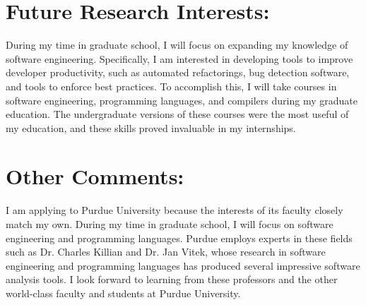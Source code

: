 \documentclass[11pt]{article}
\begin{document}
\section{Future Research Interests:}
During my time in graduate school, I will focus on expanding my knowledge of software engineering. Specifically, I am interested in developing tools to improve developer productivity, such as automated refactorings, bug detection software, and tools to enforce best practices. To accomplish this, I will take courses in software engineering, programming languages, and compilers during my graduate education. The undergraduate versions of these courses were the most useful of my education, and these skills proved invaluable in my internships.

\section{Other Comments:}
I am applying to Purdue University because the interests of its faculty closely match my own. During my time in graduate school, I will focus on software engineering and programming languages. Purdue employs experts in these fields such as Dr. Charles Killian and Dr. Jan Vitek, whose research in software engineering and programming languages has produced several impressive software analysis tools. I look forward to learning from these professors and the other world-class faculty and students at Purdue University.
\end{document}

